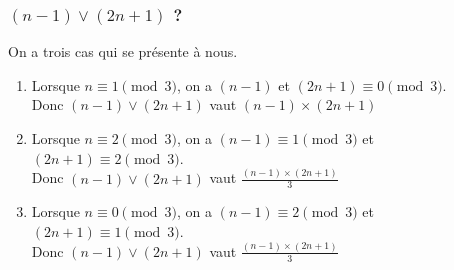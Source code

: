 \documentclass[a4paper,14pt]{extarticle} %
\begin{document}
\subsubsection*{$(n-1)\vee(2n+1)$ ?}

On a trois cas qui se présente à nous. \\

\begin{enumerate}
\item  Lorsque $n \equiv 1 \pmod{3}$, on a $(n-1)$ et $(2n+1) \equiv 0 \pmod{3}$. \\ Donc $(n-1)\vee(2n+1)$ vaut $(n-1) \times (2n+1)$
\item Lorsque $n \equiv 2 \pmod{3}$, on a $(n-1) \equiv 1 \pmod{3}$ et $(2n+1) \equiv 2 \pmod{3}$. \\ Donc $(n-1)\vee(2n+1)$ vaut $\frac{(n-1) \times (2n+1)}{3}$
\item Lorsque $n \equiv 0 \pmod{3}$, on a $(n-1) \equiv 2 \pmod{3}$ et $(2n+1) \equiv 1 \pmod{3}$. \\ Donc $(n-1)\vee(2n+1)$ vaut $\frac{(n-1) \times (2n+1)}{3}$
\end{enumerate}
\end{document}
